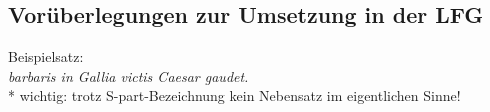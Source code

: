 \documentclass[12pt,a4paper]{article}
\begin{document}
\subsection{Vorüberlegungen zur Umsetzung in der LFG}
Beispielsatz: \\
\textit{barbaris in Gallia victis Caesar gaudet.} \\

* wichtig: trotz S-part-Bezeichnung kein Nebensatz im eigentlichen Sinne!


\end{document}

